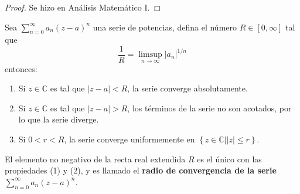 \documentclass[12pt]{report}
\newcounter{it}
\theoremstyle{largebreak}
\newcommand\abs[1]{\ensuremath{\left|#1\right|}}
\newcommand{\tbf}[1]{\textbf{#1}}
\begin{document}
    \begin{proof}
        Se hizo en Análisis Matemático I.
    \end{proof}

    \begin{theor}
        Sea $\sum_{ n=0}^\infty a_n(z-a)^n$ una serie de potencias, defina el número $R\in[0,\infty]$ tal que
        \begin{equation*}
            \frac{1}{R}=\limsup_{ n\rightarrow\infty}\abs{a_n}^{ 1/n}
        \end{equation*}
        entonces:
        \begin{enumerate}
            \item Si $z\in\mathbb{C}$ es tal que $\abs{z-a}<R$, la serie converge absolutamente.
            \item Si $z\in\mathbb{C}$ es tal que $\abs{z-a}>R$, los términos de la serie no son acotados, por lo que la serie diverge.
            \item Si $0<r<R$, la serie converge uniformemente en $\left\{ z\in\mathbb{C}\Big|\abs{z}\leq r \right\}$.
        \end{enumerate}
        El elemento no negativo de la recta real extendida $R$ es el único con las propiedades (1) y (2), y es llamado el \tbf{radio de convergencia de la serie $\sum_{ n=0}^\infty a_n(z-a)^n$}.
    \end{theor}
\end{document}
